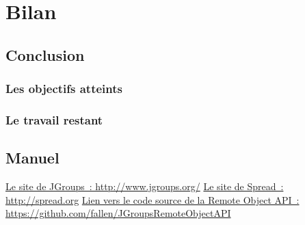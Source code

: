\documentclass[a4paper,10pt]{report}
\begin{document}
\part{Bilan}

\chapter{Conclusion}

\section{Les objectifs atteints}

\section{Le travail restant}

\chapter{Manuel}


\listoffigures

\begin{thebibliography}{99}
   \href{http://www.jgroups.org/}{Le site de JGroups~: http://www.jgroups.org/}
   \href{http://spread.org}{Le site de Spread~: http://spread.org}
   \href{https://github.com/fallen/JGroupsRemoteObjectAPI}{Lien vers le code source de la Remote Object API~: https://github.com/fallen/JGroupsRemoteObjectAPI}
\end{thebibliography}
\end{document}
